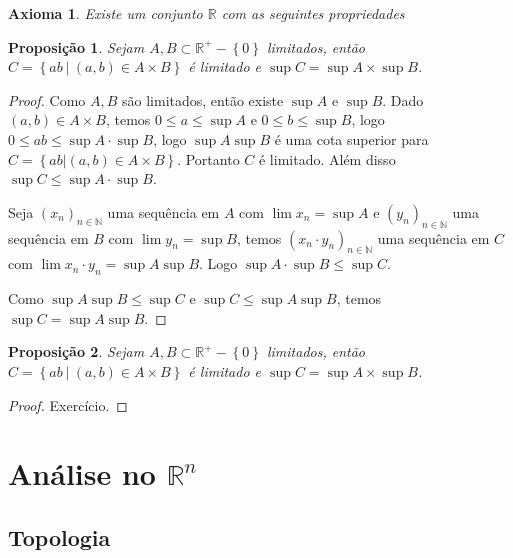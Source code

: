 \documentclass{article}
\theoremstyle{plain}
\newtheorem{axioma}{Axioma}
\newtheorem{prop}{Proposição}[section]
\theoremstyle{definition}
\theoremstyle{remark}
\begin{document}
\begin{axioma}
	Existe um conjunto $\mathbb{R}$ com as seguintes propriedades
\end{axioma}
\begin{prop}
	Sejam $A,B\subset \mathbb{R}^{+}-\left\{0\right\}$ limitados, então $C = \left\{ ab \: | \: (a,b) \in A\times B \right\}$ é limitado e $\sup C = \sup A \times \sup B$.
\end{prop}
\begin{proof}
	Como $A,B$ são limitados, então existe $\sup A$ e $\sup B$.
	Dado $(a,b) \in A\times B$, temos $ 0 \leq a \leq \sup A $ e $0\leq b \leq \sup B$, logo $0\leq ab \leq \sup A\cdot \sup B$, logo $\sup A \sup B$ é uma cota superior para $ C = \left\{ ab | (a,b) \in A\times B \right\}$. Portanto $C$ é limitado.  Além disso $\sup C  \leq \sup A \cdot \sup B$.


	Seja $(x_n)_{n\in \mathbb{N}}$ uma sequência em $A$ com $\lim x_n = \sup A$ e $(y_n)_{n\in \mathbb{N}}$ uma sequência em $B$ com $\lim y_n = \sup B$, temos $(x_n\cdot y_n)_{n \in \mathbb{N}}$ uma sequência em $C$ com $\lim x_n \cdot y_n = \sup A \sup B$. Logo $\sup A \cdot \sup B  \leq \sup C$.


	Como $\sup A \sup B \leq \sup C$ e $\sup C \leq \sup A \sup B$, temos $\sup C = \sup A \sup B$.

\end{proof}
\begin{prop}
	Sejam $A,B\subset \mathbb{R}^{+}-\left\{0\right\}$ limitados, então $C = \left\{ ab \: | \: (a,b) \in A\times B \right\}$ é limitado e $\sup C = \sup A \times \sup B$.
\end{prop}
\begin{proof}
	Exercício. %
\end{proof}



\section{Análise no $\mathbb{R}^n$}
\subsection{Topologia}
\end{document}
